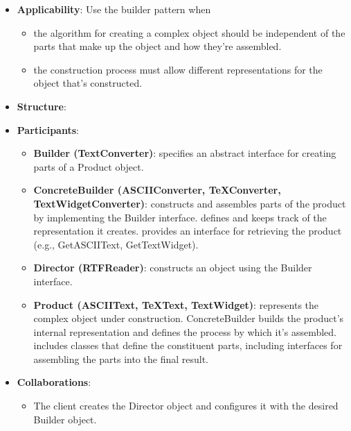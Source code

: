\documentclass{report}
\begin{document}
\begin{itemize}
            \item \textbf{Applicability}: Use the builder pattern when
                \begin{itemize}
                    \item the algorithm for creating a complex object should be independent of the parts that make up the object and how they're assembled.
                    \item the construction process must allow different representations for the object that's constructed.
                \end{itemize}
            \item \textbf{Structure}: 
                \bigbreak \noindent 
            \item \textbf{Participants}: 
                \begin{itemize}
                    \item \textbf{Builder (TextConverter)}: specifies an abstract interface for creating parts of a Product object.
                    \item \textbf{ConcreteBuilder (ASCIIConverter, TeXConverter, TextWidgetConverter)}: constructs and assembles parts of the product by implementing the Builder interface.
                        \bigbreak \noindent 
                        defines and keeps track of the representation it creates.
                        \bigbreak \noindent 
                        provides an interface for retrieving the product (e.g., GetASCIIText, GetTextWidget).
                    \item \textbf{Director (RTFReader)}: constructs an object using the Builder interface.
                    \item \textbf{Product (ASCIIText, TeXText, TextWidget)}: represents the complex object under construction. ConcreteBuilder builds the product's internal representation and defines the process by which it's assembled.
                        \bigbreak \noindent 
                        includes classes that define the constituent parts, including interfaces for assembling the parts into the final result.
                \end{itemize}
            \item \textbf{Collaborations}: 
                \begin{itemize}
                    \item The client creates the Director object and configures it with the desired Builder object.

\end{itemize}
\end{itemize}
\end{document}
